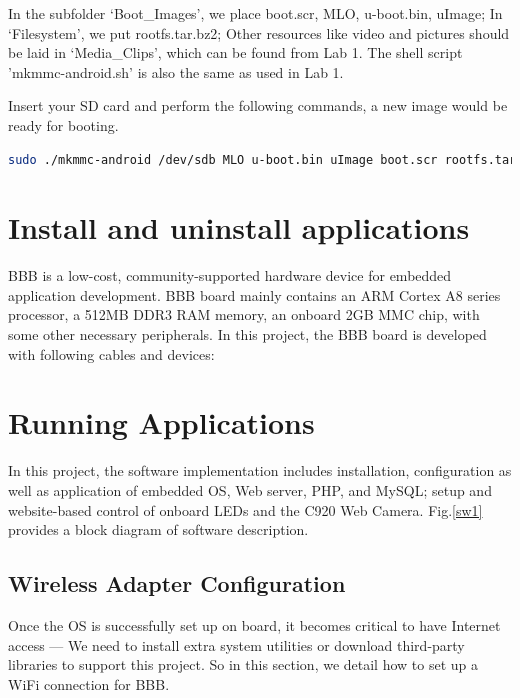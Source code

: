 \documentclass[12pt,journal,draftclsnofoot,onecolumn]{IEEEtran}
\begin{document}
In the subfolder `Boot\_Images', we place boot.scr, MLO, u-boot.bin, uImage; In `Filesystem', we put  rootfs.tar.bz2; Other resources like video and pictures should be laid in `Media\_Clips', which can be found from Lab 1. The shell script 'mkmmc-android.sh' is also the same as used in Lab 1.

Insert your SD card and perform the following commands, a new image would be ready for booting. 
 \begin{lstlisting}[language={bash}]
sudo ./mkmmc-android /dev/sdb MLO u-boot.bin uImage boot.scr rootfs.tar.bz2
\end{lstlisting}

\section{Install and uninstall applications}\label{HdDes}

BBB is a low-cost, community-supported hardware device for embedded application development. BBB board mainly contains an ARM Cortex A8 series processor, a 512MB DDR3 RAM memory, an onboard 2GB MMC chip, with some other necessary peripherals. In this project, the BBB board is developed with following cables and devices: 



\section{Running Applications}\label{SfDes}

In this project, the software implementation includes installation, configuration as well as application of embedded OS, Web server, PHP, and MySQL; setup and website-based control of onboard LEDs and the C920 Web Camera. Fig.\ref{sw1} provides a block diagram of software description.
	
\subsection{Wireless Adapter Configuration}\label{Wireless}
Once the OS is successfully set up on board, it becomes critical to have Internet access --- We need to install extra system utilities or download third-party libraries to support this project. So in this section, we detail how to set up a WiFi connection for BBB.
\end{document}
